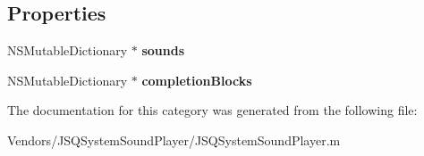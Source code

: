 \subsection*{Properties}
\begin{DoxyCompactItemize}
\item 
\hypertarget{category_j_s_q_system_sound_player_07_08_a57735d534560782498cbf19d9c7601c3}{}N\+S\+Mutable\+Dictionary $\ast$ {\bfseries sounds}\label{category_j_s_q_system_sound_player_07_08_a57735d534560782498cbf19d9c7601c3}

\item 
\hypertarget{category_j_s_q_system_sound_player_07_08_ae73b79ff959fa67203b225343c9ca6c7}{}N\+S\+Mutable\+Dictionary $\ast$ {\bfseries completion\+Blocks}\label{category_j_s_q_system_sound_player_07_08_ae73b79ff959fa67203b225343c9ca6c7}

\end{DoxyCompactItemize}


The documentation for this category was generated from the following file\+:\begin{DoxyCompactItemize}
\item 
Vendors/\+J\+S\+Q\+System\+Sound\+Player/J\+S\+Q\+System\+Sound\+Player.\+m\end{DoxyCompactItemize}
